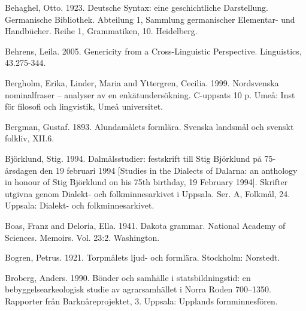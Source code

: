 \begin{styleBodytextC}
Behaghel, Otto. 1923. Deutsche Syntax: eine geschichtliche Darstellung. Germanische Bibliothek. Abteilung 1, Sammlung germanischer Elementar- und Handbücher. Reihe 1, Grammatiken, 10. Heidelberg.

\end{styleBodytextC}

\begin{styleBodytextC}
Behrens, Leila. 2005. Genericity from a Cross-Linguistic Perspective. Linguistics, 43.275-344.

\end{styleBodytextC}

\begin{styleBodytextC}
Bergholm, Erika, Linder, Maria and Yttergren, Cecilia. 1999. Nordsvenska nominalfraser – analyser av en enkätundersökning. C-uppsats 10 p. Umeå: Inst för filosofi och lingvistik, Umeå universitet.

\end{styleBodytextC}

\begin{styleBodytextC}
Bergman, Gustaf. 1893. Alundamålets formlära. Svenska landsmål och svenskt folkliv, XII.6.

\end{styleBodytextC}

\begin{styleBodytextC}
Björklund, Stig. 1994. Dalmålsstudier: festskrift till Stig Björklund på 75-årsdagen den 19 februari 1994 [Studies in the Dialects of Dalarna: an anthology in honour of Stig Björklund on his 75th birthday, 19 February 1994]. Skrifter utgivna genom Dialekt- och folkminnesarkivet i Uppsala. Ser. A, Folkmål, 24. Uppsala: Dialekt- och folkminnesarkivet.

\end{styleBodytextC}

\begin{styleBodytextC}
Boas, Franz and Deloria, Ella. 1941. Dakota grammar. National Academy of Sciences. Memoirs. Vol. 23:2. Washington.

\end{styleBodytextC}

\begin{styleBodytextC}
Bogren, Petrus. 1921. Torpmålets ljud- och formlära. Stockholm: Norstedt.

\end{styleBodytextC}

\begin{styleBodytextC}
Broberg, Anders. 1990. Bönder och samhälle i statsbildningstid: en bebyggelsearkeologisk studie av agrarsamhället i Norra Roden 700–1350. Rapporter från Barknåreprojektet, 3. Uppsala: Upplands fornminnesfören.

\end{styleBodytextC}


